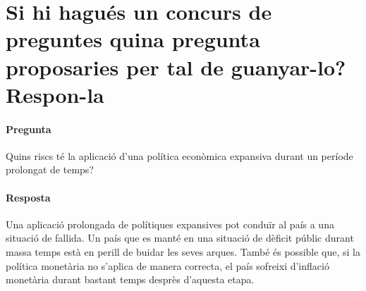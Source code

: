 \section{Si hi hagués un concurs de preguntes quina pregunta proposaries per
tal de guanyar-lo? Respon-la}

\paragraph{Pregunta}
Quins riscs té la aplicació d'una política econòmica expansiva durant un
període prolongat de temps?

\paragraph{Resposta}
Una aplicació prolongada de polítiques expansives pot conduïr al país a una
situació de fallida. Un país que es manté en una situació de dèficit públic
durant massa temps està en perill de buidar les seves arques. També és
possible que, si la política monetària no s'aplica de manera correcta, el
país sofreixi d'inflació monetària durant bastant temps desprès d'aquesta
etapa.

